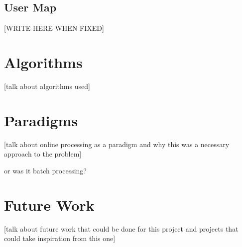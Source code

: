 \documentclass[12pt]{report}
\begin{document}
	\subsection*{User Map}
	[WRITE HERE WHEN FIXED]



\section*{Algorithms}
[talk about algorithms used]


\section*{Paradigms}
[talk about online processing as a paradigm
and why this was a necessary approach to the 
problem]


or was it batch processing?


\section*{Future Work}
[talk about future work that could be done for
this project and projects that could take inspiration
from this one]
\end{document}
